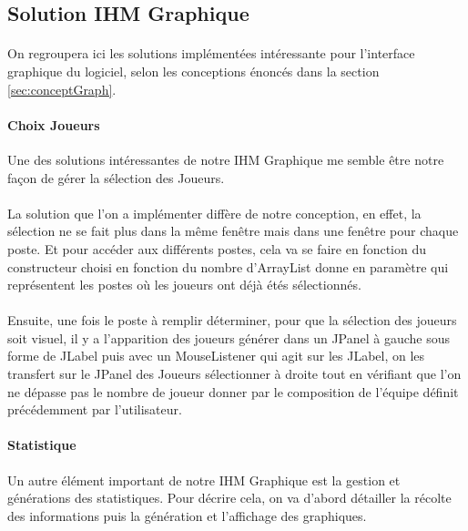 \subsection{Solution IHM Graphique}

\paragraph{}
    On regroupera ici les solutions implémentées intéressante pour l'interface graphique du logiciel, selon les conceptions énoncés dans la section \ref{sec:conceptGraph}.

\paragraph{Choix Joueurs}
    Une des solutions intéressantes de notre IHM Graphique me semble être notre façon de gérer la sélection des Joueurs.

\paragraph{}
    La solution que l'on a implémenter diffère de notre conception, en effet, la sélection ne se fait plus dans la même fenêtre mais dans une fenêtre pour chaque poste. Et pour accéder aux différents postes, cela va se faire en fonction du constructeur choisi en fonction du nombre d'ArrayList donne en paramètre qui représentent les postes où les joueurs ont déjà étés sélectionnés.
    
\paragraph{}
    Ensuite, une fois le poste à remplir déterminer, pour que la sélection des joueurs soit visuel, il y a l'apparition des joueurs générer dans un JPanel à gauche sous forme de JLabel puis avec un MouseListener qui agit sur les JLabel, on les transfert sur le JPanel des Joueurs sélectionner à droite tout en vérifiant que l'on ne dépasse pas le nombre de joueur donner par le composition de l'équipe définit précédemment par l'utilisateur.

\paragraph{Statistique}
    Un autre élément important de notre IHM Graphique est la gestion et générations des statistiques. Pour décrire cela, on va d'abord détailler la récolte des informations puis la génération et l'affichage des graphiques.
    
